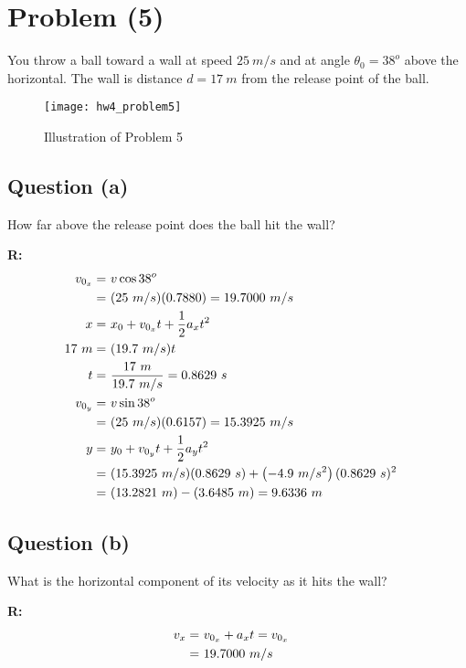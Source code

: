 \section{Problem (5)}
	You throw a ball toward a wall at speed $25 \ m/s$ and at angle $\theta_{0} = 38^{o}$ above the horizontal. The wall is distance $d = 17 \ m$ from the release point of the ball.

	\begin{figure}[H]
		\begin{center}
			\texttt{[image: hw4\_problem5]}
			\caption{Illustration of Problem 5}
			\label{fig:hw4_problem5}
		\end{center}
	\end{figure}

	\subsection{Question (a)}
		How far above the release point does the ball hit the wall?

		\textbf{R:} \newline
		\begin{align}
			v_{0_{x}} = \ &v \cos 38^{o}& \notag \\
			= \ &(25 \ m/s)(0.7880) = 19.7000 \ m/s& \notag \\
			x = \ &x_{0} + v_{0_{x}}t + \frac{1}{2}a_{x}t^{2}& \notag \\
			17 \ m = \ &(19.7 \ m/s)t& \notag \\
			t = \ &\frac{17 \ m}{19.7 \ m/s} = 0.8629 \ s& \notag \\
			v_{0_{y}} = \ &v \sin 38^{o}& \notag \\
			= \ &(25 \ m/s)(0.6157) = 15.3925 \ m/s& \notag \\
			y = \ &y_{0} + v_{0_{y}}t + \frac{1}{2}a_{y}t^{2}& \notag \\
			= \ &(15.3925 \ m/s)(0.8629 \ s) + \left(-4.9 \ m/s^{2} \right)(0.8629 \ s)^{2}& \notag \\
			= \ &(13.2821 \ m) - (3.6485 \ m) = 9.6336 \ m&
		\end{align}

	\subsection{Question (b)}
		What is the horizontal component of its velocity as it hits the wall?

		\textbf{R:} \newline
		\begin{align}
			v_{x} = \ &v_{0_{x}} + a_{x}t = v_{0_{x}}& \notag \\
			= \ &19.7000 \ m/s&
		\end{align}

